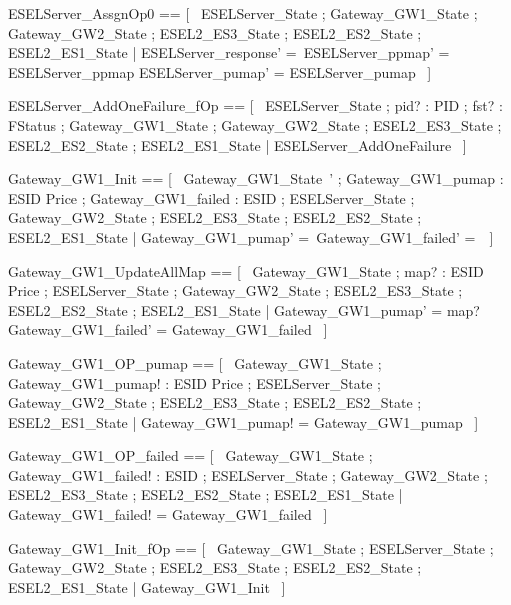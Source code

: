 \documentclass{article}
\begin{document}
\begin{zed}
	ESELServer\_AssgnOp0 == [~  \Delta ESELServer\_State ; \Xi Gateway\_GW1\_State ; \Xi Gateway\_GW2\_State ; \Xi ESEL2\_ES3\_State ; \Xi ESEL2\_ES2\_State ; \Xi ESEL2\_ES1\_State | ESELServer\_response' =~\emptyset \land ESELServer\_ppmap' = ESELServer\_ppmap \land ESELServer\_pumap' = ESELServer\_pumap  ~]
\end{zed}

\begin{zed}
	ESELServer\_AddOneFailure\_fOp == [~  \Xi ESELServer\_State ; pid? : PID ; fst? : FStatus ; \Xi Gateway\_GW1\_State ; \Xi Gateway\_GW2\_State ; \Xi ESEL2\_ES3\_State ; \Xi ESEL2\_ES2\_State ; \Xi ESEL2\_ES1\_State | \lnot \pre ESELServer\_AddOneFailure  ~]
\end{zed}

\begin{zed}
	Gateway\_GW1\_Init == [~  Gateway\_GW1\_State~' ; Gateway\_GW1\_pumap : ESID \pfun Price ; Gateway\_GW1\_failed : \power ESID ; \Xi ESELServer\_State ; \Xi Gateway\_GW2\_State ; \Xi ESEL2\_ES3\_State ; \Xi ESEL2\_ES2\_State ; \Xi ESEL2\_ES1\_State | Gateway\_GW1\_pumap' =~\emptyset \land Gateway\_GW1\_failed' =~\emptyset  ~]
\end{zed}

\begin{zed}
	Gateway\_GW1\_UpdateAllMap == [~  \Delta Gateway\_GW1\_State ; map? : ESID \pfun Price ; \Xi ESELServer\_State ; \Xi Gateway\_GW2\_State ; \Xi ESEL2\_ES3\_State ; \Xi ESEL2\_ES2\_State ; \Xi ESEL2\_ES1\_State | Gateway\_GW1\_pumap' = map? \land Gateway\_GW1\_failed' = Gateway\_GW1\_failed  ~]
\end{zed}

\begin{zed}
	Gateway\_GW1\_OP\_pumap == [~  \Xi Gateway\_GW1\_State ; Gateway\_GW1\_pumap! : ESID \pfun Price ; \Xi ESELServer\_State ; \Xi Gateway\_GW2\_State ; \Xi ESEL2\_ES3\_State ; \Xi ESEL2\_ES2\_State ; \Xi ESEL2\_ES1\_State | Gateway\_GW1\_pumap! = Gateway\_GW1\_pumap  ~]
\end{zed}

\begin{zed}
	Gateway\_GW1\_OP\_failed == [~  \Xi Gateway\_GW1\_State ; Gateway\_GW1\_failed! : \power ESID ; \Xi ESELServer\_State ; \Xi Gateway\_GW2\_State ; \Xi ESEL2\_ES3\_State ; \Xi ESEL2\_ES2\_State ; \Xi ESEL2\_ES1\_State | Gateway\_GW1\_failed! = Gateway\_GW1\_failed  ~]
\end{zed}

\begin{zed}
	Gateway\_GW1\_Init\_fOp == [~  \Xi Gateway\_GW1\_State ; \Xi ESELServer\_State ; \Xi Gateway\_GW2\_State ; \Xi ESEL2\_ES3\_State ; \Xi ESEL2\_ES2\_State ; \Xi ESEL2\_ES1\_State | \lnot \pre Gateway\_GW1\_Init  ~]
\end{zed}
\end{document}
